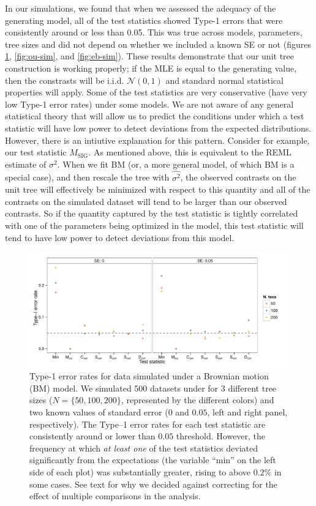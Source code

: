 In our simulations, we found that when we assessed the adequacy of the generating model, all of the test statistics showed Type-1 errors that were consistently around or less than 0.05. This was true across models, parameters, tree sizes and did not depend on whether we included a known SE or not (figures \ref{fig:bm-sim}, \ref{fig:ou-sim}, and \ref{fig:eb-sim}). These results demonstrate that our unit tree construction is working properly; if the MLE is equal to the generating value, then the constrasts will be i.i.d. $\mathcal{N}(0,1)$ and standard normal statistical properties will apply. Some of the test statistics are very conservative (have very low Type-1 error rates) under some models. We are not aware of any general statistical theory that will allow us to predict the conditions under which a test statistic will have low power to detect deviations from the expected distributions. However, there is an intiutive explanation for this pattern. Consider for example, our test statistic $M_{\text{SIG}}$. As mentioned above, this is equivalent to the REML estimate of $\sigma^2$. When we fit BM (or, a more general model, of which BM is a special case), and then rescale the tree with $\hat{\sigma^2}$, the observed contrasts on the unit tree will effectively be minimized with respect to this quantity and all of the contrasts on the simulated dataset will tend to be larger than our observed contrasts. So if the quantity captured by the test statistic is tightly correlated with one of the parameters being optimized in the model, this test statistic will tend to have low power to detect deviations from this model.

\begin{figure}[p]
  \centering
  \includegraphics[width=\textwidth]{figs/bm-sim-res}
  \caption[Type-1 error rates for data simulated under Brownian motion]{Type-1 error rates for data simulated under a Brownian motion (BM) model. We simulated 500 datasets under for 3 different tree sizes ($N=\lbrace 50, 100, 200 \rbrace $, represented by the different colors) and two known values of standard error ($0$ and $0.05$, left and right panel, respectively). The Type--1 error rates for each test statistic are consistently around or lower than $0.05$ threshold. However, the frequency at which \emph{at least one} of the test statistics deviated significantly from the expectations (the variable ``min'' on the left side of each plot) was substantially greater, rising to above $0.2\%$ in some cases. See text for why we decided against correcting for the effect of multiple comparisons in the analysis.}
  \label{fig:bm-sim}
\end{figure}

